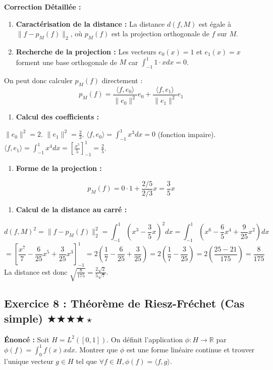 \documentclass[11pt,a4paper]{article}
\begin{document}
\textbf{Correction Détaillée :}
\begin{enumerate}
\item \textbf{Caractérisation de la distance :} La distance $d(f, M)$ est égale à $\|f - p_M(f)\|_2$, où $p_M(f)$ est la projection orthogonale de $f$ sur $M$.

\item \textbf{Recherche de la projection :} Les vecteurs $e_0(x)=1$ et $e_1(x)=x$ forment une base orthogonale de $M$ car $\int_{-1}^1 1 \cdot x dx = 0$.
\end{enumerate}
   On peut donc calculer $p_M(f)$ directement :
   $$ p_M(f) = \frac{\langle f, e_0 \rangle}{\|e_0\|^2} e_0 + \frac{\langle f, e_1 \rangle}{\|e_1\|^2} e_1 $$
\begin{enumerate}
\item \textbf{Calcul des coefficients :}
\end{enumerate}
   $\|e_0\|^2 = 2$. $\|e_1\|^2 = \frac{2}{3}$.
   $\langle f, e_0 \rangle = \int_{-1}^1 x^3 dx = 0$ (fonction impaire).
   $\langle f, e_1 \rangle = \int_{-1}^1 x^4 dx = \left[ \frac{x^5}{5} \right]_{-1}^1 = \frac{2}{5}$.
\begin{enumerate}
\item \textbf{Forme de la projection :}
\end{enumerate}
   $$ p_M(f) = 0 \cdot 1 + \frac{2/5}{2/3} x = \frac{3}{5} x $$
\begin{enumerate}
\item \textbf{Calcul de la distance au carré :}
\end{enumerate}
   $$ d(f, M)^2 = \|f - p_M(f)\|_2^2 = \int_{-1}^1 \left(x^3 - \frac{3}{5} x\right)^2 dx = \int_{-1}^1 \left(x^6 - \frac{6}{5}x^4 + \frac{9}{25}x^2\right) dx $$
   $$ = \left[ \frac{x^7}{7} - \frac{6}{25}x^5 + \frac{3}{25}x^3 \right]_{-1}^1 = 2 \left( \frac{1}{7} - \frac{6}{25} + \frac{3}{25} \right) = 2 \left( \frac{1}{7} - \frac{3}{25} \right) = 2 \left( \frac{25 - 21}{175} \right) = \frac{8}{175} $$
   La distance est donc $\sqrt{\frac{8}{175}} = \frac{2\sqrt{2}}{5\sqrt{7}}$.



\subsection*{Exercice 8 : Théorème de Riesz-Fréchet (Cas simple) \quad $\bigstar\bigstar\bigstar\bigstar\star$}

\textbf{Énoncé :}
Soit $H = L^2([0,1])$. On définit l'application $\phi: H \to \mathbb{R}$ par $\phi(f) = \int_0^1 f(x) x dx$. Montrer que $\phi$ est une forme linéaire continue et trouver l'unique vecteur $g \in H$ tel que $\forall f \in H, \phi(f) = \langle f, g \rangle$.
\end{document}
